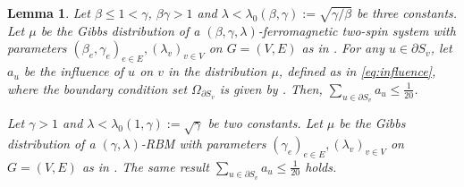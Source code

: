 \documentclass[11pt]{amsart}
\def\-#1{\mathrm{#1}}
\newcommand{\defeq}{:=}
\newcommand{\DTV}[2]{\-D_{\mathrm{TV}}\left({#1},{#2}\right)}
\newtheorem{lemma}[theorem]{Lemma}
\theoremstyle{definition}
\theoremstyle{remark}
\begin{document}
\begin{lemma}\label{lemma:assm-with-good-boundary}
    Let $\beta \leq 1 < \gamma$, $\beta\gamma > 1$ and $\lambda < \lambda_0(\beta,\gamma) \defeq \sqrt{\gamma/\beta}$ be three constants. Let $\mu$ be the Gibbs distribution of a $(\beta,\gamma,\lambda)$-ferromagnetic two-spin system with parameters $(\beta_e,\gamma_e)_{e \in E},(\lambda_v)_{v \in V}$ on $G = (V,E)$ as in .
For any $u \in \partial S_v$, let $a_u$ be the influence of $u$ on $v$ in the distribution $\mu$, defined as in \eqref{eq:influence}, where the boundary condition set $\Omega_{\partial S_v}$ is given by . 
Then, %
$\sum_{u\in \partial S_v}a_u \leq \frac{1}{20}$.

Let $\gamma > 1$ and $\lambda < \lambda_0(1,\gamma) \defeq \sqrt{\gamma}$ be two constants. Let $\mu$ be the Gibbs distribution of a $(\gamma,\lambda)$-RBM with parameters $(\gamma_e)_{e \in E},(\lambda_v)_{v \in V}$ on $G = (V,E)$ as in . The same result $\sum_{u\in \partial S_v}a_u \leq \frac{1}{20}$ holds.
\end{lemma}




\end{document}
